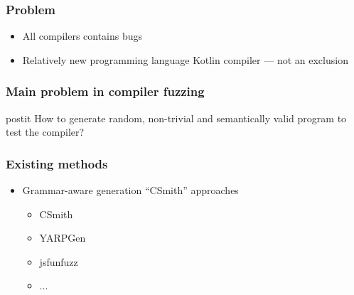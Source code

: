 


\begin{frame}
	\frametitle{Problem}
	\begin{itemize}
		\item All compilers contains bugs
		\item Relatively new programming language Kotlin compiler --- not an exclusion
	\end{itemize}
\end{frame}



\begin{frame}
	\frametitle{Main problem in compiler fuzzing}
	\begin{beamercolorbox}[sep=1em]{postit}
		\centering
		How to generate random, non-trivial and semantically valid program to test the compiler?
	\end{beamercolorbox}

\end{frame}



\begin{frame}
	\frametitle{Existing methods}
	\begin{itemize}
		\item Grammar-aware generation ``CSmith'' approaches
			\begin{itemize}
				\item CSmith
				\item YARPGen
				\item jsfunfuzz
				\item ...
			\end{itemize}
	\end{itemize}
\end{frame}

